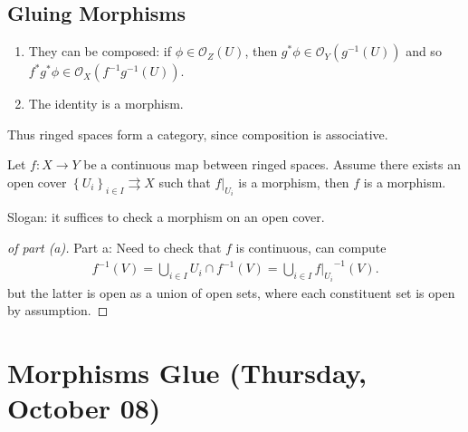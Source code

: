 \hypertarget{gluing-morphisms}{%
\subsection{Gluing Morphisms}\label{gluing-morphisms}}

\begin{proposition}

\envlist

\begin{enumerate}
\def\labelenumi{\arabic{enumi}.}
\item
  They can be composed: if \(\phi \in {\mathcal{O}}_Z(U)\), then
  \(g^* \phi \in {\mathcal{O}}_Y(g^{-1}(U))\) and so
  \(f^* g^* \phi \in {\mathcal{O}}_X(f^{-1} g^{-1} (U))\).
\item
  The identity is a morphism.
\end{enumerate}

Thus ringed spaces form a category, since composition is associative.

\end{proposition}

\begin{lemma}

Let \(f:X\to Y\) be a continuous map between ringed spaces. Assume there
exists an open cover
\(\left\{{U_i}\right\}_{i\in I}\rightrightarrows X\) such that
\({ \left.{{f}} \right|_{{U_i}} }\) is a morphism, then \(f\) is a
morphism.

\end{lemma}

\begin{remark}

Slogan: it suffices to check a morphism on an open cover.

\end{remark}

\begin{proof}[of part (a)]

Part a: Need to check that \(f\) is continuous, can compute
\begin{align*}  
f^{-1}(V) = \bigcup_{i\in I} U_i \cap f^{-1}(V) = \bigcup_{i\in I} { \left.{{f}} \right|_{{U_i}} }^{-1} (V)
.\end{align*}
but the latter is open as a union of open sets, where each constituent
set is open by assumption.

\end{proof}

\hypertarget{morphisms-glue-thursday-october-08}{%
\section{Morphisms Glue (Thursday, October
08)}\label{morphisms-glue-thursday-october-08}}

